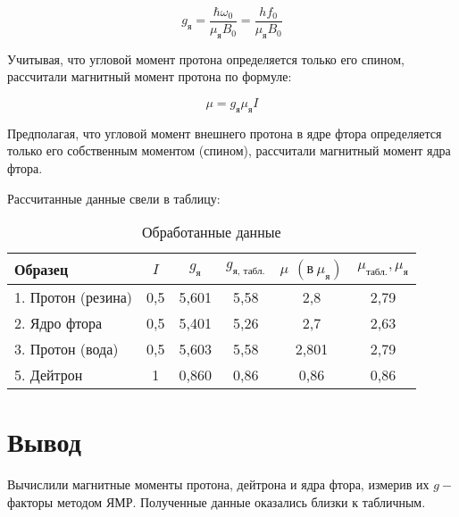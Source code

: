 \documentclass[12pt,a4paper]{article}
\begin{document}
\begin{equation}
g_\text{я} = \frac{\hbar \omega_0}{\mu_\text{я} B_0} = \frac{h f_0}{\mu_\text{я} B_0}
\end{equation}

 Учитывая, что угловой момент протона определяется только его спином, рассчитали магнитный момент протона по формуле:
 
 	\begin{equation}
 	\mu = g_\text{я} \mu_\text{я}I
 	\end{equation}
 
 Предполагая, что  угловой момент внешнего протона в ядре фтора определяется только его собственным моментом (спином), рассчитали магнитный момент ядра фтора. 
 
 Рассчитанные данные свели в таблицу:


\begin{table} [h]
	\centering
	\caption{Обработанные данные} 
\begin{tabular}{|l||c|c|c|c|c|}
	\hline
Образец & $I$ & $g_\text{я}$ & $g_\text{я, табл.}$ & $\mu$ $(\text{в} ~\mu_\text{я})$ & $ \mu_\text{табл.}, \mu_\text{я} $ \\
\hline
1. Протон (резина)  & 0,5 & 5,601 & 5,58 & 2,8 & 2,79  \\
\hline
2. Ядро фтора   & 0,5 & 5,401 & 5,26 & 2,7 & 2,63  \\
\hline
3. Протон (вода)& 0,5 & 5,603 & 5,58 & 2,801 & 2,79  \\
\hline
5. Дейтрон  & 1 & 0,860 & 0,86 & 0,86 & 0,86  \\ 
\hline
\end{tabular}
\end{table}

\section{Вывод}
Вычислили магнитные моменты протона, дейтрона и ядра фтора, измерив их $g-$факторы методом ЯМР. Полученные данные оказались близки к табличным.
\end{document}
